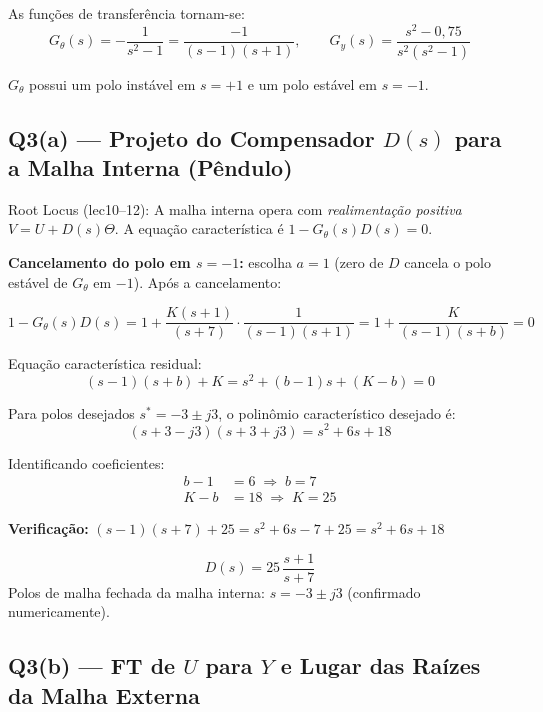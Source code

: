 \documentclass[12pt,a4paper]{article}
\begin{document}
As funções de transferência tornam-se:
\[
  G_\theta(s) = -\frac{1}{s^2-1} = \frac{-1}{(s-1)(s+1)}, \qquad
  G_y(s) = \frac{s^2-0{,}75}{s^2(s^2-1)}
\]

$G_\theta$ possui um polo instável em $s = +1$ e um polo estável em $s=-1$.

\subsection*{Q3(a) — Projeto do Compensador $D(s)$ para a Malha Interna (Pêndulo)}

\begin{metodo}
  Root Locus (lec10--12): A malha interna opera com \emph{realimentação positiva}
  $V = U + D(s)\Theta$. A equação característica é $1 - G_\theta(s)D(s) = 0$.
\end{metodo}

\textbf{Cancelamento do polo em $s=-1$:} escolha $a = 1$ (zero de $D$ cancela
o polo estável de $G_\theta$ em $-1$). Após a cancelamento:

\[
  1 - G_\theta(s)D(s) = 1 + \frac{K(s+1)}{(s+7)} \cdot \frac{1}{(s-1)(s+1)}
  = 1 + \frac{K}{(s-1)(s+b)} = 0
\]

Equação característica residual:
\[
  (s-1)(s+b) + K = s^2 + (b-1)s + (K-b) = 0
\]

Para polos desejados $s^* = -3 \pm j3$, o polinômio característico desejado é:
\[
  (s+3-j3)(s+3+j3) = s^2 + 6s + 18
\]

Identificando coeficientes:
\begin{align*}
  b - 1 &= 6 \;\Rightarrow\; b = 7 \\
  K - b &= 18 \;\Rightarrow\; K = 25
\end{align*}

\textbf{Verificação:} $(s-1)(s+7) + 25 = s^2 + 6s - 7 + 25 = s^2 + 6s + 18$ \checkmark

\begin{resposta}
\[
  \boxed{D(s) = 25\,\frac{s+1}{s+7}}
\]
Polos de malha fechada da malha interna: $s = -3 \pm j3$ (confirmado numericamente).
\end{resposta}

\subsection*{Q3(b) — FT de $U$ para $Y$ e Lugar das Raízes da Malha Externa}
\end{document}
